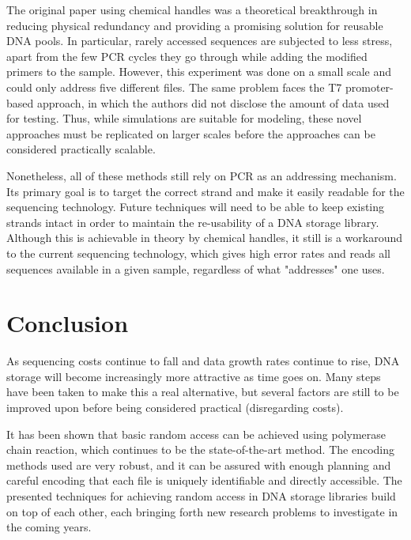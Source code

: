 \documentclass[a4paper,conference]{IEEEtran}
\begin{document}
The original paper using chemical handles was a theoretical breakthrough in reducing physical redundancy and providing a promising solution for reusable DNA pools. In particular, rarely accessed sequences are subjected to less stress, apart from the few PCR cycles they go through while adding the modified primers to the sample. However, this experiment was done on a small scale and could only address five different files. The same problem faces the T7 promoter-based approach, in which the authors did not disclose the amount of data used for testing. Thus, while simulations are suitable for modeling, these novel approaches must be replicated on larger scales before the approaches can be considered practically scalable. 

Nonetheless, all of these methods still rely on PCR as an addressing mechanism. Its primary goal is to target the correct strand and make it easily readable for the sequencing technology. Future techniques will need to be able to keep existing strands intact in order to maintain the re-usability of a DNA storage library. Although this is achievable in theory by chemical handles, it still is a workaround to the current sequencing technology, which gives high error rates and reads all sequences available in a given sample, regardless of what "addresses" one uses. 


\section{Conclusion}
As sequencing costs continue to fall and data growth rates continue to rise, DNA storage will become increasingly more attractive as time goes on. Many steps have been taken to make this a real alternative, but several factors are still to be improved upon before being considered practical (disregarding costs).

It has been shown that basic random access can be achieved using polymerase chain reaction, which continues to be the state-of-the-art method. The encoding methods used are very robust, and it can be assured with enough planning and careful encoding that each file is uniquely identifiable and directly accessible. The presented techniques for achieving random access in DNA storage libraries build on top of each other, each bringing forth new research problems to investigate in the coming years.
\end{document}

